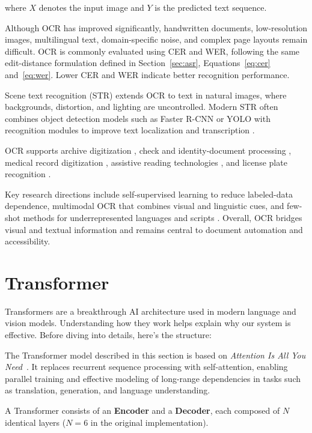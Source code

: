 where $X$ denotes the input image and $Y$ is the predicted text sequence.

Although OCR has improved significantly, handwritten documents, low-resolution images, multilingual text, domain-specific noise, and complex page layouts remain difficult. OCR is commonly evaluated using CER and WER, following the same edit-distance formulation defined in Section~\ref{sec:asr}, Equations~\ref{eq:cer} and~\ref{eq:wer}. Lower CER and WER indicate better recognition performance.

Scene text recognition (STR) extends OCR to text in natural images, where backgrounds, distortion, and lighting are uncontrolled. Modern STR often combines object detection models such as Faster R-CNN or YOLO with recognition modules to improve text localization and transcription \cite{baek2019whatiswrong}.

OCR supports archive digitization \cite{holley2009howgood}, check and identity-document processing \cite{govindaraju1994handwritten}, medical record digitization \cite{zhou2022automatic}, assistive reading technologies \cite{anagnostopoulos2006license}, and license plate recognition \cite{du2013automatic}.

Key research directions include self-supervised learning to reduce labeled-data dependence, multimodal OCR that combines visual and linguistic cues, and few-shot methods for underrepresented languages and scripts \cite{li2023trocr}. Overall, OCR bridges visual and textual information and remains central to document automation and accessibility.

\section{Transformer}
\label{sec:transformer}

Transformers are a breakthrough AI architecture used in modern language and vision models. Understanding how they work helps explain why our system is effective. Before diving into details, here's the structure:

The Transformer model described in this section is based on \emph{Attention Is All You Need}~\cite{vaswani2017attentionNeurIPS}. It replaces recurrent sequence processing with self-attention, enabling parallel training and effective modeling of long-range dependencies in tasks such as translation, generation, and language understanding.

A Transformer consists of an \textbf{Encoder} and a \textbf{Decoder}, each composed of $N$ identical layers ($N = 6$ in the original implementation).

